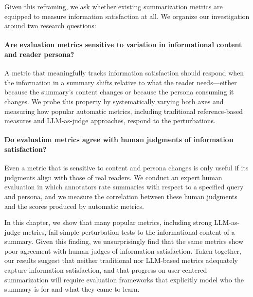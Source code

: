 Given this reframing, we ask whether existing summarization metrics are equipped to measure information satisfaction at all. We organize our investigation around two research questions:

\paragraph{{\chsevenrqone\label{chsevenrq1}} Are evaluation metrics sensitive to variation in informational content and reader persona?}
A metric that meaningfully tracks information satisfaction should respond when the information in a summary shifts relative to what the reader needs—either because the summary's content changes or because the persona consuming it changes. We probe this property by systematically varying both axes and measuring how popular automatic metrics, including traditional reference-based measures and LLM-as-judge approaches, respond to the perturbations.

\paragraph{{\chsevenrqtwo\label{chsevenrq2}} Do evaluation metrics agree with human judgments of information satisfaction?} 
Even a metric that is sensitive to content and persona changes is only useful if its judgments align with those of real readers. We conduct an expert human evaluation in which annotators rate summaries with respect to a specified query and persona, and we measure the correlation between these human judgments and the scores produced by automatic metrics.


In this chapter, we show that many popular metrics, including strong LLM-as-judge metrics, fail simple perturbation tests to the informational content of a summary. Given this finding, we unsurprisingly find that the same metrics show poor agreement with human judges of information satisfaction. Taken together, our results suggest that neither traditional nor LLM-based metrics adequately capture information satisfaction, and that progress on user-centered summarization will require evaluation frameworks that explicitly model who the summary is for and what they came to learn.
